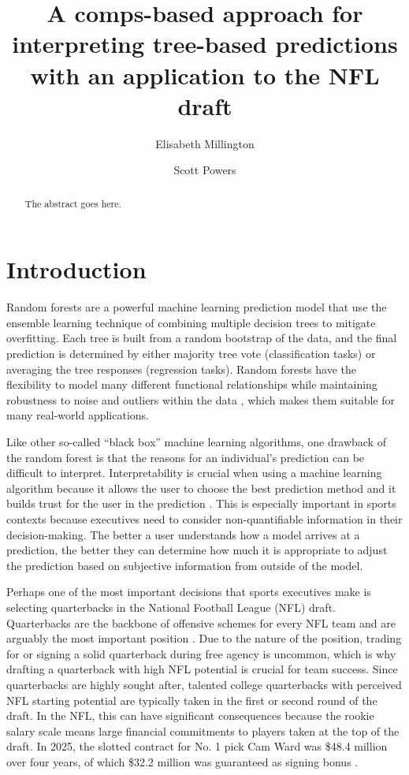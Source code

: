 \documentclass{article}
\title{A comps-based approach for interpreting tree-based predictions with an application to the NFL draft}
\author[1]{Elisabeth Millington}
\author[2]{Scott Powers}
\affil[1]{Department of Kinesiology, Rice University}
\affil[2]{Department of Sport Management, Rice University}
\begin{document}
\maketitle

\begin{abstract}
  The abstract goes here.
\end{abstract}

\section{Introduction}

Random forests are a powerful machine learning prediction model that use the ensemble learning technique of combining multiple decision trees to mitigate overfitting. Each tree is built from a random bootstrap of the data, and the final prediction is determined by either majority tree vote (classification tasks) or averaging the tree responses (regression tasks). Random forests have the flexibility to model many different functional relationships while maintaining robustness to noise and outliers within the data \citep{breiman_random_2001}, which makes them suitable for many real-world applications.

Like other so-called ``black box'' machine learning algorithms, one drawback of the random forest is that the reasons for an individual's prediction can be difficult to interpret. Interpretability is crucial when using a machine learning algorithm because it allows the user to choose the best prediction method and it builds trust for the user in the prediction \citep{ribeiro_why_2016}. This is especially important in sports contexts because executives need to consider non-quantifiable information in their decision-making. The better a user understands how a model arrives at a prediction, the better they can determine how much it is appropriate to adjust the prediction based on subjective information from outside of the model.

Perhaps one of the most important decisions that sports executives make is selecting quarterbacks in the National Football League (NFL) draft. Quarterbacks are the backbone of offensive schemes for every NFL team and are arguably the most important position \citep{hughes_positional_2015}. Due to the nature of the position, trading for or signing a solid quarterback during free agency is uncommon, which is why drafting a quarterback with high NFL potential is crucial for team success. Since quarterbacks are highly sought after, talented college quarterbacks with perceived NFL starting potential are typically taken in the first or second round of the draft. In the NFL, this can have significant consequences because the rookie salary scale means large financial commitments to players taken at the top of the draft. In 2025, the slotted contract for No. 1 pick Cam Ward was \$48.4 million over four years, of which \$32.2 million was guaranteed as signing bonus \citep{badenhausen_nfl_2025}.
\end{document}
